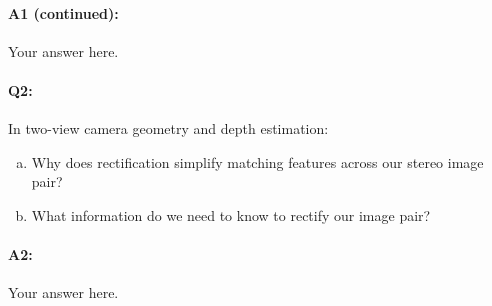 



\pagebreak
\paragraph{A1 (continued):} Your answer here.


\pagebreak
\paragraph{Q2:} In two-view camera geometry and depth estimation:
\begin{enumerate} [(a)]
\item Why does rectification simplify matching features across our stereo image pair?
\item What information do we need to know to rectify our image pair?
\end{enumerate}

\paragraph{A2:} Your answer here.






\pagebreak
